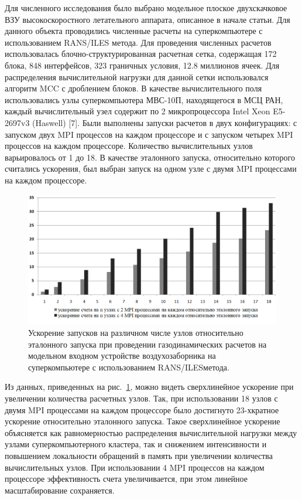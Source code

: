 Для численного исследования было выбрано модельное плоское двухскачковое ВЗУ высокоскоростного летательного аппарата, описанное в начале статьи.
Для данного объекта проводились численные расчеты на суперкомпьютере с использованием RANS/ILES метода.
Для проведения численных расчетов использовалась блочно-структурированная расчетная сетка, содержащая 172 блока, 848 интерфейсов, 323 граничных условия, 12.8 миллионов ячеек.
Для распределения вычислительной нагрузки для данной сетки использовался алгоритм MCC с дроблением блоков.
В качестве вычислительного поля использовались узлы суперкомпьютера МВС-10П, находящегося в МСЦ РАН, каждый вычислительный узел содержит по 2 микропроцессора Intel Xeon E5-2697v3 (Haswell) [7]. 
Были выполнены запуски расчетов в двух конфигурациях: с запуском двух MPI процессов на каждом процессоре и с запуском четырех MPI процессов на каждом процессоре.
Количество вычислительных узлов варьировалось от 1 до 18.
В качестве эталонного запуска, относительно которого считались ускорения, был выбран запуск на одном узле с двумя MPI процессами на каждом процессоре. 

\begin{figure}[ht]
	\centering
	\includegraphics[width=1.0\textwidth]{./pics/text_2_withcut/scaling.png}
	\caption{Ускорение запусков на различном числе узлов относительно эталонного запуска при проведении газодинамических расчетов на модельном входном устройстве воздухозаборника на суперкомпьютере с использованием RANS/ILESметода.}
	\label{fig:text_2_withcut_scaling}
\end{figure}

Из данных, приведенных на рис.~\ref{fig:text_2_withcut_scaling}, можно видеть сверхлинейное ускорение при увеличении количества расчетных узлов.
Так, при использовании 18 узлов с двумя MPI процессами на каждом процессоре было достигнуто 23-хкратное ускорение относительно эталонного запуска.
Такое сверхлинейное ускорение объясняется как равномерностью распределения вычислительной нагрузки между узлами суперкомпьютерного кластера, так и снижением интенсивности и повышением локальности обращений в память при увеличении количества вычислительных узлов.
При использовании 4 MPI процессов на каждом процессоре эффективность счета увеличивается, при этом линейное масштабирование сохраняется.
